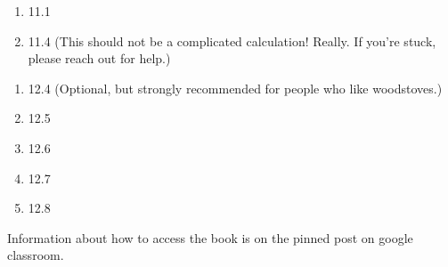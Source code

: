 \documentclass[11pt]{article}
\begin{document}
\begin{enumerate}
\setlength{\itemsep}{-1mm}
\item 11.1
\item 11.4 (This should not be a complicated calculation! Really. If
  you're stuck, please reach out for help.) \\ 
\end{enumerate}



\begin{enumerate}
  \setlength{\itemsep}{-1mm}
\item 12.4 (Optional, but strongly recommended for people who like
  woodstoves.) 
\item 12.5
\item 12.6
\item 12.7
\item 12.8
\end{enumerate}


\noindent Information about how to access the book is on the
pinned post on google classroom. 
\end{document}
